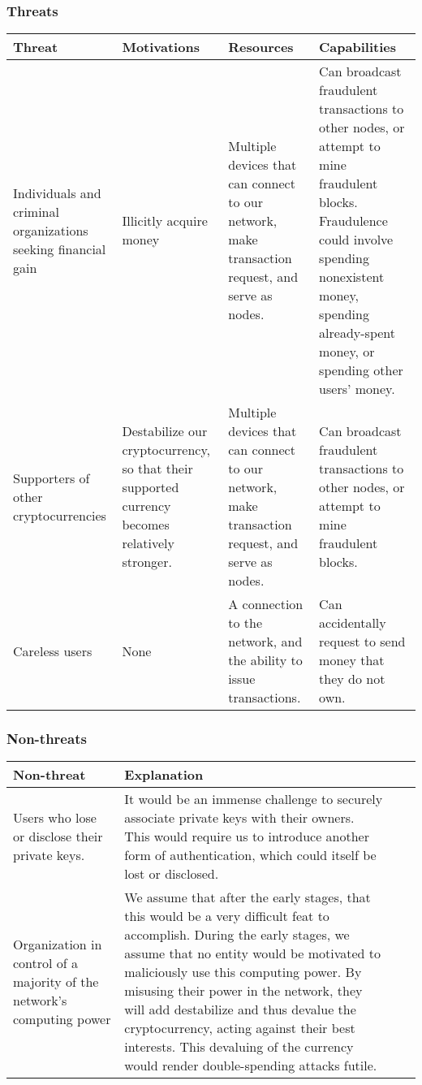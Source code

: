 \documentclass[12pt]{article}
\begin{document}
\subsubsection*{Threats}

\begin{tabulary}{\linewidth}{|L|L|L|L|}
\hline
\textbf{Threat} & \textbf{Motivations} & \textbf{Resources} & \textbf{Capabilities} \\
\hline
Individuals and criminal organizations seeking financial gain & Illicitly acquire money & Multiple devices that can connect to our network, make transaction request, and serve as nodes. & Can broadcast fraudulent transactions to other nodes, or attempt to mine fraudulent blocks. Fraudulence could involve spending nonexistent money, spending already-spent money, or spending other users' money. \\
\hline
Supporters of other cryptocurrencies & Destabilize our cryptocurrency, so that their supported currency becomes relatively stronger. & Multiple devices that can connect to our network, make transaction request, and serve as nodes. & Can broadcast fraudulent transactions to other nodes, or attempt to mine fraudulent blocks. \\
\hline
Careless users & None & A connection to the network, and the ability to issue transactions. & Can accidentally request to send money that they do not own. \\
\hline
\end{tabulary}

\subsubsection*{Non-threats}

\begin{tabulary}{\linewidth}{|L|L|L|L|}
\hline
\textbf{Non-threat} & \textbf{Explanation}\\
\hline
Users who lose or disclose their private keys. & It would be an immense challenge to securely associate private keys with their owners. This would require us to introduce another form of authentication, which could itself be lost or disclosed. \\
\hline
Organization in control of a majority of the network's computing power & We assume that after the early stages, that this would be a very difficult feat to accomplish. During the early stages, we assume that no entity would be motivated to maliciously use this computing power. By misusing their power in the network, they will add destabilize and thus devalue the cryptocurrency, acting against their best interests. This devaluing of the currency would render double-spending attacks futile. \\
\hline
\end{tabulary}
\end{document}
